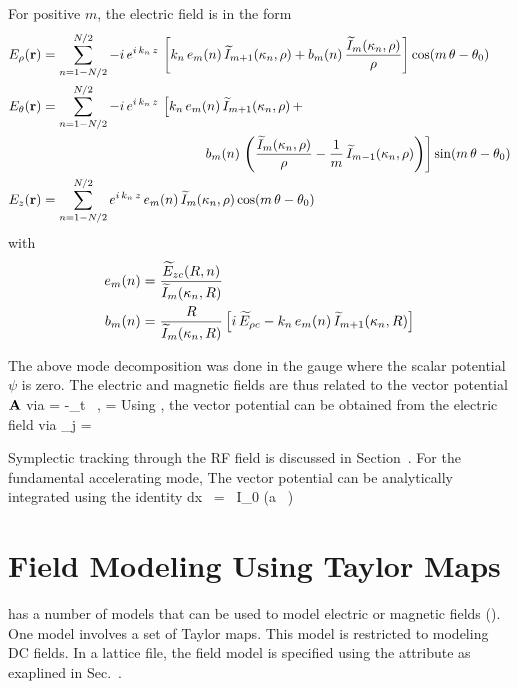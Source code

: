 For positive $m$, the electric field is in the form
\begin{align}
  E_\rho({\bf r}) &= \sum_{n=1-N/2}^{N/2}
    -i \, e^{i \, k_n \, z} \, 
    \left[ 
    k_n \, e_m(n) \, \widetilde I_{m+1}(\kappa_n, \rho) +
    b_m(n) \, \frac{\widetilde I_m(\kappa_n, \rho)}{\rho}
    \right]
    \cos(m \, \theta - \theta_0) \nonumber \\
  E_\theta({\bf r}) &= \sum_{n=1-N/2}^{N/2} 
    -i \, e^{i \, k_n \, z} \, 
    \left[
    k_n \, e_m(n) \, \widetilde I_{m+1}(\kappa_n, \rho) \, + \right. \\
  & \left. \qquad \qquad \qquad \qquad \qquad \qquad
    b_m(n) \, \left( \frac{\widetilde I_m(\kappa_n, \rho)}{\rho} - 
    \frac{1}{m} \, \widetilde I_{m-1}(\kappa_n, \rho) \right)
    \right] 
    \sin(m \, \theta - \theta_0) \nonumber \\
  E_z({\bf r}) &= \sum_{n=1-N/2}^{N/2}e^{i \, k_n \, z} \, 
    e_m(n) \, \widetilde I_m(\kappa_n, \rho) \cos(m \, \theta - \theta_0) \nonumber
\end{align}
with
\begin{align}
  e_m(n) &= \frac{\widetilde E_{zc}(R, n)}{\widetilde I_m(\kappa_n, R)} \nonumber \\
  b_m(n) &= \frac{R}{\widetilde I_m(\kappa_n, R)} \left[
    i \, \widetilde E_{\rho c} - k_n \, e_m(n) \, \widetilde I_{m+1}(\kappa_n, R)
    \right]
\end{align}

The above mode decomposition was done in the gauge where the scalar
potential $\psi$ is zero. The electric and magnetic fields are thus
related to the vector potential ${\bf A}$ via
\Begineq
  \bfE = -\partial_t \, \bfA, \qquad \bfB = \nabla \times \bfA
\Endeq
Using , the vector potential can be obtained from the
electric field via
\Begineq
  \bfA_j = 
  \label{aiew}
\Endeq
 
Symplectic tracking through the RF field is discussed in
Section~.  For the fundamental accelerating mode,
The vector potential can be analytically integrated using the identity
\Begineq
  \int dx \,  = 
   \, I_0 (a \, )
\Endeq

\section{Field Modeling Using Taylor Maps}
\label{s:taylor.field.phys}

\bmad has a number of  models that can be used to model electric or magnetic fields
(). One model involves a set of Taylor maps. This model is restricted to
modeling DC fields. In a lattice file, the  field model is specified using the
 attribute as exaplined in Sec.~.

